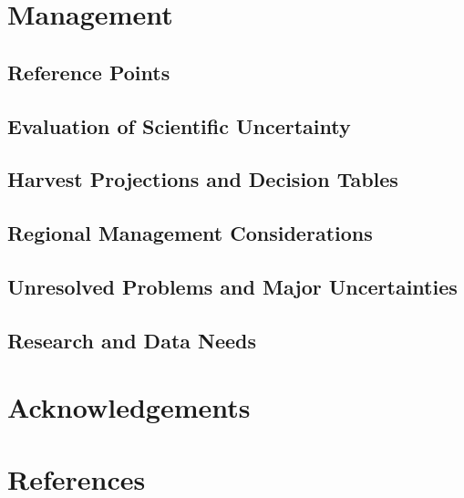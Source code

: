 \documentclass[
]{scrartcl}
\begin{document}
\newpage{}

\section{Management}\label{management}

\subsection{Reference Points}\label{reference-points-1}

\subsection{Evaluation of Scientific
Uncertainty}\label{evaluation-of-scientific-uncertainty-1}

\subsection{Harvest Projections and Decision
Tables}\label{harvest-projections-and-decision-tables-1}

\subsection{Regional Management
Considerations}\label{regional-management-considerations}

\subsection{Unresolved Problems and Major
Uncertainties}\label{unresolved-problems-and-major-uncertainties-1}

\subsection{Research and Data Needs}\label{research-and-data-needs-1}

\newpage{}

\section{Acknowledgements}\label{sec-acknowledgements}

\newpage{}

\section{References}\label{references}
\end{document}
